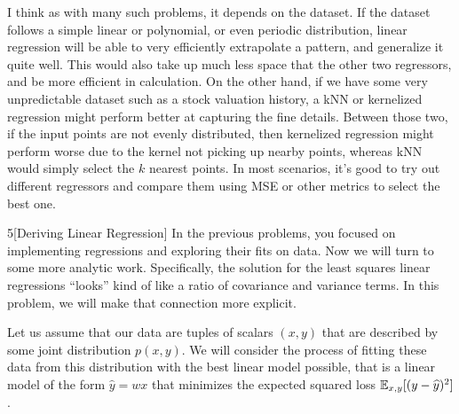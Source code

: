 \documentclass[expanded]{lkx_pset}
\begin{document}
\begin{parts}
	I think as with many such problems, it depends on the dataset. If the dataset follows a simple linear or polynomial, or even periodic distribution, linear regression will be able to very efficiently extrapolate a pattern, and generalize it quite well. This would also take up much less space that the other two regressors, and be more efficient in calculation. On the other hand, if we have some very unpredictable dataset such as a stock valuation history, a kNN or kernelized regression might perform better at capturing the fine details. Between those two, if the input points are not evenly distributed, then kernelized regression might perform worse due to the kernel not picking up nearby points, whereas kNN would simply select the $k$ nearest points. In most scenarios, it's good to try out different regressors and compare them using MSE or other metrics to select the best one.
\end{parts}

\begin{problem}{5}[Deriving Linear Regression]
In the previous problems, you focused on implementing regressions
and exploring their fits on data. Now we will turn to some more
analytic work.  Specifically, the solution for the least squares
linear regressions ``looks'' kind of like a ratio of covariance and
variance terms.  In this problem, we will make that connection more
explicit.

\medskip
Let us assume that our data are tuples of scalars $(x,y)$ that are
described by some joint distribution $p(x,y)$. We will consider the process of fitting these data from this distribution with the best linear model
possible, that is a linear model of the form $\hat{y} = wx$ that
minimizes the expected squared loss $\mathbb{E}_{x,y}[ ( y - \widehat{y} )^2
	]$.
\end{problem}
\end{document}
